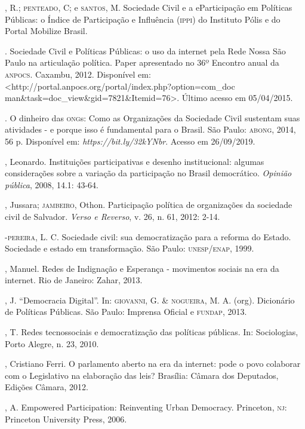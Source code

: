 \begin{bibliohedra}
, R.; \textsc{penteado}, C; e \textsc{santos}, M. Sociedade Civil e a eParticipação
em Políticas Públicas: o Índice de Participação e Influência (\textsc{ippi}) do
Instituto Pólis e do Portal Mobilize Brasil.

\titidem.
Sociedade Civil e Políticas Públicas: o uso da internet pela Rede Nossa
São Paulo na articulação política. Paper apresentado no 36º Encontro
anual da \textsc{anpocs}. Caxambu, 2012. Disponível em:
\textless{}http://portal.anpocs.org/portal/index.php?option=com\_doc
man\&task=doc\_view\&gid=7821\&Itemid=76\textgreater{}. Último acesso em
05/04/2015.

. O dinheiro das \textsc{ong}s: Como as Organizações da
Sociedade Civil sustentam suas atividades - e porque isso é fundamental
para o Brasil. São Paulo: \textsc{abong}, 2014, 56 p. Disponível em:
\emph{https://bit.ly/32kYNbr}.
Acesso em 26/09/2019.

, Leonardo. Instituições participativas e desenho institucional:
algumas considerações sobre a variação da participação no Brasil
democrático. \emph{Opinião pública}, 2008, 14.1: 43-64.

, Jussara; \textsc{jambeiro}, Othon. Participação política de organizações
da sociedade civil de Salvador. \emph{Verso e Reverso}, v. 26, n. 61,
2012: 2-14.

-\textsc{pereira}, L. C. Sociedade civil: sua democratização para a
reforma do Estado. Sociedade e estado em transformação. São Paulo:
\textsc{unesp}/\textsc{enap}, 1999.

, Manuel. Redes de Indignação e Esperança - movimentos sociais
na era da internet. Rio de Janeiro: Zahar, 2013.

, J. ``Democracia Digital''. In: \textsc{giovanni}, G. \& \textsc{nogueira}, M. A.
(org). Dicionário de Políticas Públicas. São Paulo: Imprensa Oficial e
\textsc{fundap}, 2013.

, T. Redes tecnossociais e democratização das políticas públicas.
In: Sociologias, Porto Alegre, n. 23, 2010.

, Cristiano Ferri. O parlamento aberto na era da internet: pode o
povo colaborar com o Legislativo na elaboração das leis? Brasília:
Câmara dos Deputados, Edições Câmara, 2012.

, A. Empowered Participation: Reinventing Urban Democracy.
Princeton, \textsc{nj}: Princeton University Press, 2006.


\end{bibliohedra}
